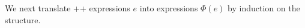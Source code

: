 We next translate \lang++ expressions $e$ into \ARA expressions $\Phi(e)$ by induction on the structure.
%
